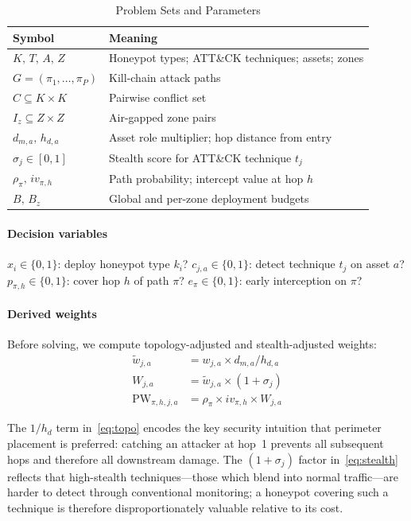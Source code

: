 \documentclass[journal]{IEEEtran}
\begin{document}
\begin{table}[t]
\caption{Problem Sets and Parameters}
\label{tab:symbols}
\centering
\renewcommand{\arraystretch}{1.2}
\begin{tabular}{ll}
\toprule
Symbol & Meaning \\
\midrule
$K,\,T,\,A,\,Z$ & Honeypot types; ATT\&CK techniques; assets; zones \\
$G=(\pi_1,\dots,\pi_P)$ & Kill-chain attack paths \\
$C\subseteq K\times K$ & Pairwise conflict set \\
$I_z\subseteq Z\times Z$ & Air-gapped zone pairs \\
$d_{m,a},\,h_{d,a}$ & Asset role multiplier; hop distance from entry \\
$\sigma_j\in[0,1]$ & Stealth score for ATT\&CK technique $t_j$ \\
$\rho_\pi,\,iv_{\pi,h}$ & Path probability; intercept value at hop $h$ \\
$B,\,B_z$ & Global and per-zone deployment budgets \\
\bottomrule
\end{tabular}
\end{table}

\paragraph{Decision variables}
$x_i\in\{0,1\}$: deploy honeypot type $k_i$?
$c_{j,a}\in\{0,1\}$: detect technique $t_j$ on asset $a$?
$p_{\pi,h}\in\{0,1\}$: cover hop $h$ of path $\pi$?
$e_\pi\in\{0,1\}$: early interception on $\pi$?

\paragraph{Derived weights}
Before solving, we compute topology-adjusted and stealth-adjusted
weights:
\begin{align}
  \tilde{w}_{j,a} &= w_{j,a}\times d_{m,a}/h_{d,a}
  \label{eq:topo}\\
  W_{j,a} &= \tilde{w}_{j,a}\times(1+\sigma_j)
  \label{eq:stealth}\\
  \mathrm{PW}_{\pi,h,j,a} &= \rho_\pi\times iv_{\pi,h}\times W_{j,a}
  \label{eq:pathweight}
\end{align}

The $1/h_d$ term in~\eqref{eq:topo} encodes the key security
intuition that perimeter placement is preferred: catching an attacker
at hop~1 prevents all subsequent hops and therefore all downstream
damage. The $(1+\sigma_j)$ factor in~\eqref{eq:stealth} reflects
that high-stealth techniques---those which blend into normal
traffic---are harder to detect through conventional monitoring; a
honeypot covering such a technique is therefore disproportionately
valuable relative to its cost.
\end{document}
